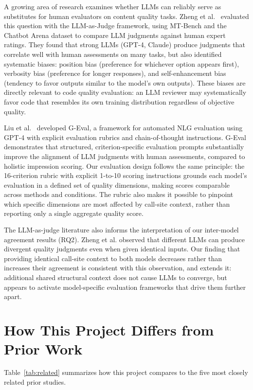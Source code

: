 \documentclass[12pt]{report}
\begin{document}
A growing area of research examines whether LLMs can reliably serve as substitutes for human evaluators on content quality tasks. Zheng et al.~\cite{zheng2023judging} evaluated this question with the LLM-as-Judge framework, using MT-Bench and the Chatbot Arena dataset to compare LLM judgments against human expert ratings. They found that strong LLMs (GPT-4, Claude) produce judgments that correlate well with human assessments on many tasks, but also identified systematic biases: position bias (preference for whichever option appears first), verbosity bias (preference for longer responses), and self-enhancement bias (tendency to favor outputs similar to the model's own outputs). These biases are directly relevant to code quality evaluation: an LLM reviewer may systematically favor code that resembles its own training distribution regardless of objective quality.

Liu et al.~\cite{liu2023geval} developed G-Eval, a framework for automated NLG evaluation using GPT-4 with explicit evaluation rubrics and chain-of-thought instructions. G-Eval demonstrates that structured, criterion-specific evaluation prompts substantially improve the alignment of LLM judgments with human assessments, compared to holistic impression scoring. Our evaluation design follows the same principle: the 16-criterion rubric with explicit 1-to-10 scoring instructions grounds each model's evaluation in a defined set of quality dimensions, making scores comparable across methods and conditions. The rubric also makes it possible to pinpoint which specific dimensions are most affected by call-site context, rather than reporting only a single aggregate quality score.

The LLM-as-judge literature also informs the interpretation of our inter-model agreement results (RQ2). Zheng et al. observed that different LLMs can produce divergent quality judgments even when given identical inputs. Our finding that providing identical call-site context to both models decreases rather than increases their agreement is consistent with this observation, and extends it: additional shared structural context does not cause LLMs to converge, but appears to activate model-specific evaluation frameworks that drive them further apart.

\section{How This Project Differs from Prior Work}

Table~\ref{tab:related} summarizes how this project compares to the five most closely related prior studies.
\end{document}

